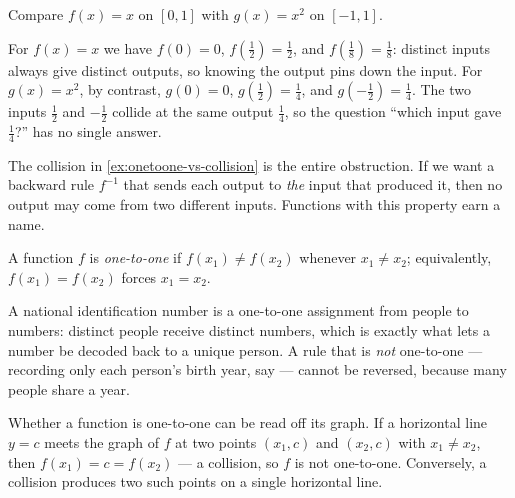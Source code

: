 \begin{workedexample}
\begin{example}\label{ex:onetoone-vs-collision}
Compare \(f(x) = x\) on \([0, 1]\) with \(g(x) = x^{2}\) on \([-1, 1]\).
\end{example}

\begin{solution}
For \(f(x) = x\) we have \(f(0) = 0\), \(f(\tfrac{1}{2}) = \tfrac{1}{2}\), and \(f(\tfrac{1}{8}) = \tfrac{1}{8}\): distinct inputs always give distinct outputs, so knowing the output pins down the input. For \(g(x) = x^{2}\), by contrast, \(g(0) = 0\), \(g(\tfrac{1}{2}) = \tfrac{1}{4}\), and \(g(-\tfrac{1}{2}) = \tfrac{1}{4}\). The two inputs \(\tfrac{1}{2}\) and \(-\tfrac{1}{2}\) collide at the same output \(\tfrac{1}{4}\), so the question ``which input gave \(\tfrac{1}{4}\)?'' has no single answer.
\end{solution}
\end{workedexample}

The collision in \cref{ex:onetoone-vs-collision} is the entire obstruction. If we want a backward rule \(f^{-1}\) that sends each output to \emph{the} input that produced it, then no output may come from two different inputs. Functions with this property earn a name.

\begin{definition}\label{def:one-to-one}
A function \(f\) is \emph{one-to-one} if \(f(x_{1}) \ne f(x_{2})\) whenever \(x_{1} \ne x_{2}\); equivalently, \(f(x_{1}) = f(x_{2})\) forces \(x_{1} = x_{2}\).
\end{definition}

\begin{remark}
A national identification number is a one-to-one assignment from people to numbers: distinct people receive distinct numbers, which is exactly what lets a number be decoded back to a unique person. A rule that is \emph{not} one-to-one --- recording only each person's birth year, say --- cannot be reversed, because many people share a year.
\end{remark}

Whether a function is one-to-one can be read off its graph. If a horizontal line \(y = c\) meets the graph of \(f\) at two points \((x_{1}, c)\) and \((x_{2}, c)\) with \(x_{1} \ne x_{2}\), then \(f(x_{1}) = c = f(x_{2})\) --- a collision, so \(f\) is not one-to-one. Conversely, a collision produces two such points on a single horizontal line.


